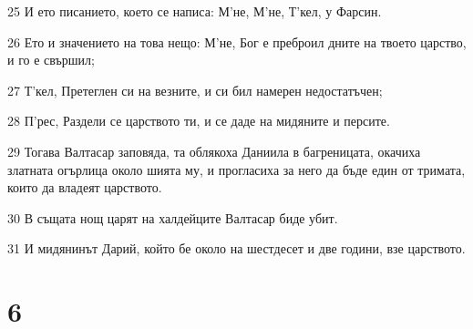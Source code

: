 \par 25 И ето писанието, което се написа: М'не, М'не, Т'кел, у Фарсин.
\par 26 Ето и значението на това нещо: М'не, Бог е преброил дните на твоето царство, и го е свършил;
\par 27 Т'кел, Претеглен си на везните, и си бил намерен недостатъчен;
\par 28 П'рес, Раздели се царството ти, и се даде на мидяните и персите.
\par 29 Тогава Валтасар заповяда, та облякоха Даниила в багреницата, окачиха златната огърлица около шията му, и прогласиха за него да бъде един от тримата, които да владеят царството.
\par 30 В същата нощ царят на халдейците Валтасар биде убит.
\par 31 И мидянинът Дарий, който бе около на шестдесет и две години, взе царството.

\chapter{6}

